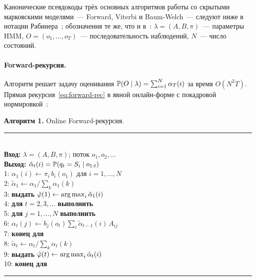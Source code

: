 %
Канонические псевдокоды трёх основных алгоритмов работы со
скрытыми марковскими моделями~--- Forward, Viterbi и
Baum-Welch~--- следуют ниже в нотации Рабинера~\cite{Rabiner1989};
обозначения те же, что и в~:
$\lambda=(A,B,\pi)$~--- параметры HMM, $O=(o_1,\dots,o_T)$~---
последовательность наблюдений, $N$~--- число состояний.

\paragraph*{Forward-рекурсия.} Алгоритм решает задачу оценивания
$\mathbb{P}(O\mid\lambda) = \sum_{i=1}^N\alpha_T(i)$ за время $O(N^2 T)$.
Прямая рекурсия~\eqref{eq:forward-rec} в явной онлайн-форме с
покадровой нормировкой~\cite[\S~V-A]{Rabiner1989}:

\par\addvspace{2pt}
{\centering
\begin{minipage}{0.97\linewidth}
\footnotesize
\textbf{Алгоритм 1.} Online Forward-рекурсия. \\[1pt]
\rule{\linewidth}{0.4pt}\vspace{1pt}\\
\textbf{Вход:} $\lambda=(A,B,\pi)$; поток $o_1,o_2,\dots$ \\
\textbf{Выход:} $\tilde\alpha_t(i) = \mathbb{P}(q_t=S_i\mid o_{1:t})$ \\
1: $\alpha_1(i) \gets \pi_i\,b_i(o_1)$ для $i=1,\dots,N$ \\
2: $\tilde\alpha_1 \gets \alpha_1 / \sum_k \alpha_1(k)$ \\
3: \textbf{выдать} $\hat\varphi(1) \gets \operatorname*{arg\,max}_i \tilde\alpha_1(i)$ \\
4: \textbf{для} $t = 2, 3, \dots$ \textbf{выполнить} \\
5: \quad \textbf{для} $j = 1, \dots, N$ \textbf{выполнить} \\
6: \quad\quad $\alpha_t(j) \gets b_j(o_t)\sum_{i}
                \tilde\alpha_{t-1}(i)\,A_{ij}$ \\
7: \quad \textbf{конец для} \\
8: \quad $\tilde\alpha_t \gets \alpha_t / \sum_k \alpha_t(k)$ \\
9: \quad \textbf{выдать} $\hat\varphi(t) \gets \operatorname*{arg\,max}_i \tilde\alpha_t(i)$ \\
10: \textbf{конец для} \\
\rule{\linewidth}{0.4pt}
\end{minipage}\par}
\addvspace{4pt}

